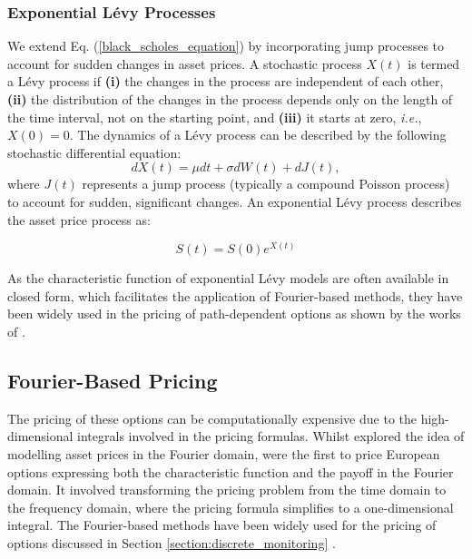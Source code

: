 \documentclass[a4paper]{report}
\begin{document}
\subsubsection{Exponential L\'evy Processes}
We extend Eq. (\ref{black_scholes_equation}) by incorporating jump processes to account for sudden changes in asset prices. A stochastic process $X(t)$ is termed a L\'evy process if \textbf{(i)} the changes in the process are independent of each other, \textbf{(ii)} the distribution of the changes in the process depends only on the length of the time interval, not on the starting point, and \textbf{(iii)} it starts at zero, \textit{i.e.}, $X(0) = 0$. The dynamics of a L\'evy process can be described by the following stochastic differential equation:
\begin{equation}
dX(t) = \mu dt + \sigma dW(t) + dJ(t),
\end{equation}
where $J(t)$ represents a jump process (typically a compound Poisson process) to account for sudden, significant changes. An exponential L\'evy process describes the asset price process as:

\begin{equation}
S(t) = S(0)e^{X(t)}	
\end{equation}

As the characteristic function of exponential L\'evy models are often available in closed form, which facilitates the application of Fourier-based methods, they have been widely used in the pricing of path-dependent options as shown by the works of \citet{fusai2016spitzer, kwok2011efficient, feng2008pricing, phelan2019hilbert}.

\subsection{Fourier-Based Pricing}
The pricing of these options can be computationally expensive due to the high-dimensional integrals involved in the pricing formulas. Whilst \citet{heston1993closed} explored the idea of modelling asset prices in the Fourier domain, \citet{carr1999option} were the first to price European options expressing both the characteristic function and the payoff in the Fourier domain. It involved transforming the pricing problem from the time domain to the frequency domain, where the pricing formula simplifies to a one-dimensional integral. The Fourier-based methods have been widely used for the pricing of options discussed in Section \ref{section:discrete_monitoring} \citep{eberlein2010analysis}.
\end{document}
